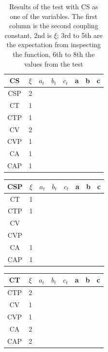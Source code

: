 \documentclass[twocolumn]{article}
\begin{document}
\begin{table}[H]
	\begin{tabular}{|c|c|c|c|c|c|c|c|}
		\hline
		CS & $\xi $& $a_t$ & $b_t$ & $c_t$ & a & b & c \\
		\hline
		CSP & 2 &   &   &   &   &   &  \\
		\hline
		CT & 1 &   &   &   &   &   &  \\
		\hline
		CTP & 1 &   &   &   &   &   &  \\
		\hline
		CV & 2 &   &   &   &   &   &  \\
		\hline
		CVP & 1 &   &   &   &   &   &  \\
		\hline
		CA & 1 &   &   &   &   &   &  \\
		\hline
		CAP & 1 &   &   &   &   &   &  \\
		\hline
	\end{tabular}
	\caption{Results of the test with CS as one of the variables. The first column is the second coupling constant, 2nd is $\xi$; 3rd to 5th are the expectation from inspecting the function, 6th to 8th the values from the test}
\end{table}

\begin{table}[H]
	\begin{tabular}{|c|c|c|c|c|c|c|c|}
		\hline
		CSP & $\xi $& $a_t$ & $b_t$ & $c_t$ & a & b & c \\
		\hline
		CT & 1 &   &   &   &   &   &   \\
		\hline
		CTP & 1 &   &   &   &   &   &   \\
		\hline
		CV &   &   &   &   &   &   &   \\
		\hline
		CVP &   &   &   &   &   &   &   \\
		\hline
		CA & 1 &   &   &   &   &   &   \\
		\hline
		CAP & 1 &   &   &   &   &   &   \\
		\hline
	\end{tabular}
\end{table}

\begin{table}[H]
	\begin{tabular}{|c|c|c|c|c|c|c|c|}
		\hline
		CT & $\xi $& $a_t$ & $b_t$ & $c_t$ & a & b & c \\
		\hline
		CTP & 2 &   &   &   &   &   &   \\
		\hline
		CV & 1 &   &   &   &   &   &   \\
		\hline
		CVP & 1 &   &   &   &   &   &   \\
		\hline
		CA & 2 &   &   &   &   &   &   \\
		\hline
		CAP & 2 &   &   &   &   &   &   \\
		\hline
	\end{tabular}
\end{table}
\end{document}
